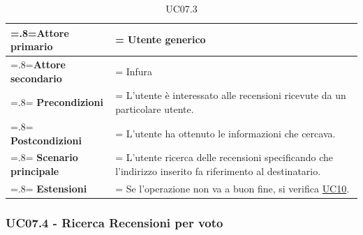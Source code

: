             \begin{table}[H]
                \centering
                \renewcommand{\arraystretch}{1.8}
                \renewcommand\tabularxcolumn[1]{m{#1}}
                \begin{tabularx}{0.9\textwidth} {
                    >{\hsize=.8\hsize\linewidth=\hsize}X
                    >{\hsize=1.2\hsize\linewidth=\hsize}X}
                    \hline
                    \textbf{Attore primario} & Utente generico \\
                    \hline
                    \textbf{Attore secondario} & Infura \\
                    \hline
                    \textbf{Precondizioni} & L'utente è interessato alle recensioni ricevute da un particolare utente. \\
                    \hline
                    \textbf{Postcondizioni} & L'utente ha ottenuto le informazioni che cercava. \\
                    \hline
                    \textbf{Scenario principale} & L'utente ricerca delle recensioni specificando che l'indirizzo inserito fa riferimento al destinatario.\\
                    \hline
                    \textbf{Estensioni} & Se l'operazione non va a buon fine, si verifica \hyperref[UC10]{UC10}. \\
                    \hline
                \end{tabularx}
                \caption{UC07.3}
            \end{table}

        \subsubsection{UC07.4 - Ricerca Recensioni per voto}
        \label{UC07.4}

